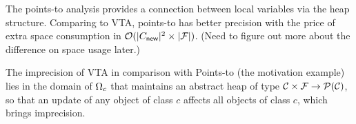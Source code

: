 \documentclass{llncs}
\newcommand\power{\mathcal{P}}
\newcommand{\keyword}[1]{\mathsf{#1}}
\newcommand{\kwnew}[0]{\keyword{new}}
\newcommand\Var{\mathtt{VAR}}
\begin{document}
The points-to analysis provides a connection between local variables via the heap structure. Comparing to VTA, points-to
has better precision with the price of extra space consumption in $\bigO(|C_{\kwnew}|^2\times|\Field|)$.
(Need to figure out more about the difference on space usage later.)



The imprecision of VTA in comparison with Points-to (the motivation example) lies in the domain of $\Omega_c$ that maintains an abstract heap
of type $\Class\times\Field\rightarrow\power(\Class)$, so that an update of any object of class $c$ affects
all objects of class $c$, which brings imprecision.
\end{document}
